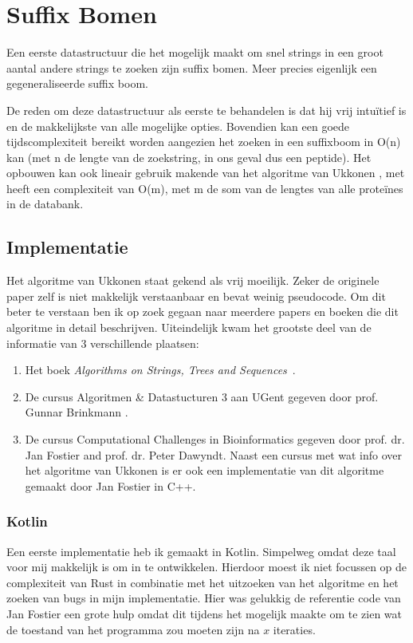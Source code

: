 \chapter{Suffix Bomen}\label{ch:suffix-bomen}
Een eerste datastructuur die het mogelijk maakt om snel strings in een groot aantal andere strings te zoeken zijn suffix bomen.
Meer precies eigenlijk een gegeneraliseerde suffix boom.

De reden om deze datastructuur als eerste te behandelen is dat hij vrij intuïtief is en de makkelijkste van alle mogelijke opties.
Bovendien kan een goede tijdscomplexiteit bereikt worden aangezien het zoeken in een suffixboom in O(n) kan (met n de lengte van de zoekstring, in ons geval dus een peptide).
Het opbouwen kan ook lineair gebruik makende van het algoritme van Ukkonen \cite{Ukkonen1995}, met heeft een complexiteit van O(m), met m de som van de lengtes van alle proteïnes in de databank.

\section{Implementatie}\label{sec:implementatie}
Het algoritme van Ukkonen staat gekend als vrij moeilijk.
Zeker de originele paper zelf is niet makkelijk verstaanbaar en bevat weinig pseudocode.
Om dit beter te verstaan ben ik op zoek gegaan naar meerdere papers en boeken die dit algoritme in detail beschrijven.
Uiteindelijk kwam het grootste deel van de informatie van 3 verschillende plaatsen:
\begin{enumerate}
    \item Het boek \textit{Algorithms on Strings, Trees and Sequences}~\cite{Gusfield1997}.
    \item De cursus Algoritmen \& Datastucturen 3 aan UGent gegeven door prof. Gunnar Brinkmann \cite{AD3_ukkonen}.
    \item De cursus Computational Challenges in Bioinformatics gegeven door prof. dr. Jan Fostier and prof. dr. Peter Dawyndt.
    Naast een cursus met wat info over het algoritme van Ukkonen is er ook een implementatie van dit algoritme gemaakt door Jan Fostier in C++. %
\end{enumerate}

\subsection{Kotlin}\label{subsec:kotlin}
Een eerste implementatie heb ik gemaakt in Kotlin.
Simpelweg omdat deze taal voor mij makkelijk is om in te ontwikkelen.
Hierdoor moest ik niet focussen op de complexiteit van Rust in combinatie met het uitzoeken van het algoritme en het zoeken van bugs in mijn implementatie.
Hier was gelukkig de referentie code van Jan Fostier een grote hulp omdat dit tijdens het mogelijk maakte om te zien wat de toestand van het programma zou moeten zijn na $x$ iteraties.

